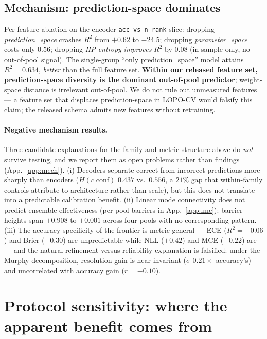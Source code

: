\documentclass[11pt]{article}
\begin{document}
\subsection{Mechanism: prediction-space dominates}\label{sec:mech-pred}

Per-feature ablation on the encoder \texttt{acc vs n\_rank} slice: dropping \emph{prediction\_space} crashes $R^2$ from $+0.62$ to $-24.5$; dropping \emph{parameter\_space} costs only $0.56$; dropping \emph{HP entropy} \emph{improves} $R^2$ by $0.08$ (in-sample only, no out-of-pool signal). The single-group ``only prediction\_space'' model attains $R^2{=}0.634$, \emph{better} than the full feature set. \textbf{Within our released feature set, prediction-space diversity is the dominant out-of-pool predictor}; weight-space distance is irrelevant out-of-pool. We do not rule out unmeasured features --- a feature set that displaces prediction-space in LOPO-CV would falsify this claim; the released schema admits new features without retraining.

\paragraph{Negative mechanism results.} Three candidate explanations for the family and metric structure above do \emph{not} survive testing, and we report them as open problems rather than findings (App.~\ref{app:mech}). (i) Decoders separate correct from incorrect predictions more sharply than encoders ($H(c|\mathrm{conf})$ $0.437$ vs.\ $0.556$, a $21\%$ gap that within-family controls attribute to architecture rather than scale), but this does not translate into a predictable calibration benefit. (ii) Linear mode connectivity does not predict ensemble effectiveness (per-pool barriers in App.~\ref{app:lmc}): barrier heights span $+0.908$ to $+0.001$ across four pools with no corresponding pattern. (iii) The accuracy-specificity of the frontier is metric-general --- ECE ($R^2{=}{-}0.06$) and Brier ($-0.30$) are unpredictable while NLL ($+0.42$) and MCE ($+0.22$) are --- and the natural refinement-versus-reliability explanation is falsified: under the Murphy decomposition, resolution gain is near-invariant ($\sigma$ $0.21{\times}$ accuracy's) and uncorrelated with accuracy gain ($r{=}{-}0.10$).

\section{Protocol sensitivity: where the apparent benefit comes from}\label{sec:protocol}
\end{document}
